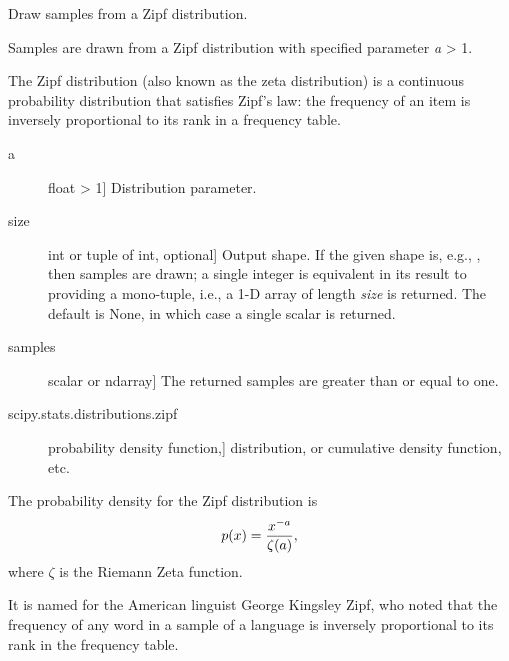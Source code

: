 \documentclass[letterpaper,10pt,english]{sphinxmanual}
\begin{document}

\begin{fulllineitems}
\label{pygeomod:pygeomod.geomodeller_xml_obj.zipf}
Draw samples from a Zipf distribution.

Samples are drawn from a Zipf distribution with specified parameter
\emph{a} \textgreater{} 1.

The Zipf distribution (also known as the zeta distribution) is a
continuous probability distribution that satisfies Zipf's law: the
frequency of an item is inversely proportional to its rank in a
frequency table.
\begin{description}
\item[{a}] \leavevmode{[}float \textgreater{} 1{]}
Distribution parameter.

\item[{size}] \leavevmode{[}int or tuple of int, optional{]}
Output shape.  If the given shape is, e.g., , then
 samples are drawn; a single integer is equivalent in
its result to providing a mono-tuple, i.e., a 1-D array of length
\emph{size} is returned.  The default is None, in which case a single
scalar is returned.

\end{description}
\begin{description}
\item[{samples}] \leavevmode{[}scalar or ndarray{]}
The returned samples are greater than or equal to one.

\end{description}
\begin{description}
\item[{scipy.stats.distributions.zipf}] \leavevmode{[}probability density function,{]}
distribution, or cumulative density function, etc.

\end{description}

The probability density for the Zipf distribution is
\begin{gather}
\begin{split}p(x) = \frac{x^{-a}}{\zeta(a)},\end{split}\notag
\end{gather}
where \(\zeta\) is the Riemann Zeta function.

It is named for the American linguist George Kingsley Zipf, who noted
that the frequency of any word in a sample of a language is inversely
proportional to its rank in the frequency table.


\end{fulllineitems}
\end{document}
